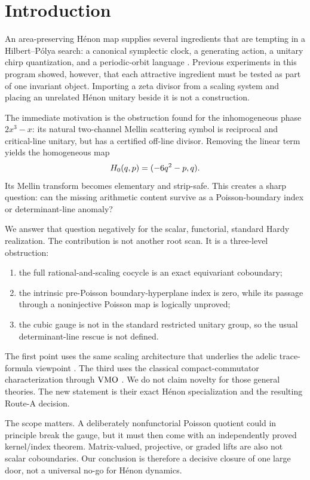 \section{Introduction}

An area-preserving H\'enon map supplies several ingredients that are
tempting in a Hilbert--P\'olya search: a canonical symplectic clock, a
generating action, a unitary chirp quantization, and a periodic-orbit
language \citep{Wang2026HenonModel}.  Previous experiments in this program
showed, however, that each attractive ingredient must be tested as part of
one invariant object.  Importing a zeta divisor from a scaling system and
placing an unrelated H\'enon unitary beside it is not a construction.

The immediate motivation is the obstruction found for the inhomogeneous
phase \(2x^3-x\): its natural two-channel Mellin scattering symbol is
reciprocal and critical-line unitary, but has a certified off-line divisor.
Removing the linear term yields the homogeneous map
\begin{equation}\label{eq:H0}
  H_0(q,p)=(-6q^2-p,q).
\end{equation}
Its Mellin transform becomes elementary and strip-safe.  This creates a
sharp question: can the missing arithmetic content survive as a
Poisson-boundary index or determinant-line anomaly?

We answer that question negatively for the scalar, functorial, standard
Hardy realization.  The contribution is not another root scan.  It is a
three-level obstruction:
\begin{enumerate}[label=(\roman*)]
  \item the full rational-and-scaling cocycle is an exact equivariant
  coboundary;
  \item the intrinsic pre-Poisson boundary-hyperplane index is zero, while
  its passage through a noninjective Poisson map is logically unproved;
  \item the cubic gauge is not in the standard restricted unitary group,
  so the usual determinant-line rescue is not defined.
\end{enumerate}

The first point uses the same scaling architecture that underlies the
adelic trace-formula viewpoint \citep{Connes1999,ConnesConsani2021}.  The
third uses the classical compact-commutator characterization through
\(\operatorname{VMO}\) \citep{Uchiyama1978}.  We do not claim novelty for those general
theories.  The new statement is their exact H\'enon specialization and the
resulting Route-A decision.

The scope matters.  A deliberately nonfunctorial Poisson quotient could in
principle break the gauge, but it must then come with an independently
proved kernel/index theorem.  Matrix-valued, projective, or graded lifts
are also not scalar coboundaries.  Our conclusion is therefore a decisive
closure of one large door, not a universal no-go for H\'enon dynamics.
